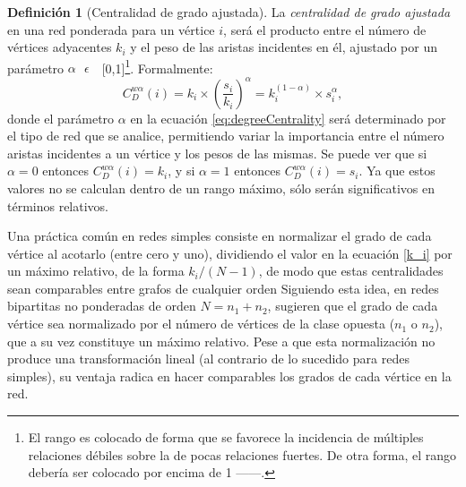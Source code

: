 \documentclass[letterpaper, 11pt]{book}
\theoremstyle{definition}
\newtheorem{definition}{Definición}[chapter]
\theoremstyle{remark}
\begin{document}
\begin{definition}[Centralidad de grado ajustada]
\label{CentralidadGrado}
    La \emph{centralidad de grado ajustada} en una red ponderada para un vértice $i$, será el producto entre el número de vértices adyacentes $k_{i}$ y el peso de las aristas incidentes en él, ajustado por un parámetro $\alpha \text{ } \epsilon  \text{ } $ [0,1]\footnote{
	El rango es colocado de forma que se favorece la incidencia de múltiples relaciones débiles sobre la de pocas relaciones fuertes. De otra forma, el rango debería ser colocado por encima de 1 ---\citet{2010_Opsahl_NodeCentralityWeighted}---.
    }. Formalmente:
    \begin{equation}\label{eq:degreeCentrality}
	C_{D}^{w \alpha}(i) = k_{i} \times \left( \frac{s_{i}}{k_{i}} \right) ^{\alpha} = k_{i}^{(1-\alpha)} \times s_{i}^{\alpha},
    \end{equation} 
    donde el parámetro $\alpha$ en la ecuación \ref{eq:degreeCentrality} será determinado por el tipo de red que se analice, permitiendo variar la importancia entre el número aristas incidentes a un vértice y los pesos de las mismas. 
    Se puede ver que si $\alpha = 0 $ entonces $ C_{D}^{w \alpha}(i) = k_{i} $, y si $\alpha = 1 $ entonces $ C_{D}^{w \alpha}(i) = s_{i} $. 
    Ya que estos valores no se calculan dentro de un rango máximo, sólo serán significativos en términos relativos.
\end{definition}


Una práctica común en redes simples consiste en normalizar el grado de cada vértice al acotarlo (entre cero y uno), dividiendo el valor en la ecuación \ref{k_i} por un máximo relativo, de la forma $k_{i}/(N-1)$, de modo que estas centralidades sean comparables entre grafos de cualquier orden  
Siguiendo esta idea, en redes bipartitas no ponderadas de orden $N = n_{1} + n_{2}$, \citet{1997_Borgatti_2ModeSNA} sugieren que el grado de cada vértice sea normalizado por el número de vértices de la clase opuesta ($n_{1}$ o $n_{2}$), que a su vez constituye un máximo relativo. 
Pese a que esta normalización no produce una transformación lineal (al contrario de lo sucedido para redes simples), su ventaja radica en hacer comparables los grados de cada vértice en la red. 
\end{document}
